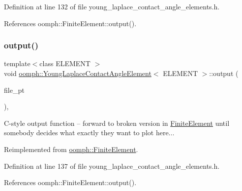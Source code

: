 Definition at line 132 of file young\+\_\+laplace\+\_\+contact\+\_\+angle\+\_\+elements.\+h.



References oomph\+::\+Finite\+Element\+::output().

\mbox{\label{classoomph_1_1YoungLaplaceContactAngleElement_a589f36dd06e87691b15d1f9700311833}} 
\subsubsection{\texorpdfstring{output()}{output()}\hspace{0.1cm}{\footnotesize\ttfamily [3/4]}}
{\footnotesize\ttfamily template$<$class E\+L\+E\+M\+E\+NT $>$ \\
void \hyperlink{classoomph_1_1YoungLaplaceContactAngleElement}{oomph\+::\+Young\+Laplace\+Contact\+Angle\+Element}$<$ E\+L\+E\+M\+E\+NT $>$\+::output (\begin{DoxyParamCaption}\item[{F\+I\+LE $\ast$}]{file\+\_\+pt }\end{DoxyParamCaption})\hspace{0.3cm}{\ttfamily [inline]}, {\ttfamily [virtual]}}

C-\/style output function -- forward to broken version in \hyperlink{classoomph_1_1FiniteElement}{Finite\+Element} until somebody decides what exactly they want to plot here... 

Reimplemented from \hyperlink{classoomph_1_1FiniteElement_a72cddd09f8ddbee1a20a1ff404c6943e}{oomph\+::\+Finite\+Element}.



Definition at line 137 of file young\+\_\+laplace\+\_\+contact\+\_\+angle\+\_\+elements.\+h.



References oomph\+::\+Finite\+Element\+::output().

\mbox{\label{classoomph_1_1YoungLaplaceContactAngleElement_adbabdfc299dcc79b82870690ccd9ec64}} 
